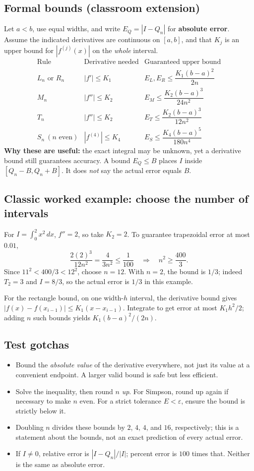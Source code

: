\documentclass[11pt]{article}
\newcommand{\dx}{\,dx}
\begin{document}
\subsection*{Formal bounds (classroom extension)}
Let $a<b$, use equal widths, and write $E_Q=|I-Q_n|$ for \textbf{absolute error}. Assume the indicated derivatives are continuous on $[a,b]$, and that $K_j$ is an upper bound for $|f^{(j)}(x)|$ on the \emph{whole} interval.
\[
\begin{array}{c|c|c}
\text{Rule}&\text{Derivative needed}&\text{Guaranteed upper bound}\\\hline
L_n\text{ or }R_n&|f'|\le K_1&E_L,E_R\le\dfrac{K_1(b-a)^2}{2n}\\[0.8em]
M_n&|f''|\le K_2&E_M\le\dfrac{K_2(b-a)^3}{24n^2}\\[0.8em]
T_n&|f''|\le K_2&E_T\le\dfrac{K_2(b-a)^3}{12n^2}\\[0.8em]
S_n\ (n\text{ even})&|f^{(4)}|\le K_4&E_S\le\dfrac{K_4(b-a)^5}{180n^4}
\end{array}
\]
\textbf{Why these are useful:} the exact integral may be unknown, yet a derivative bound still guarantees accuracy. A bound $E_Q\le B$ places $I$ inside $[Q_n-B,Q_n+B]$. It does \emph{not} say the actual error equals $B$.

\subsection*{Classic worked example: choose the number of intervals}
For $I=\int_0^2x^2\dx$, $f''=2$, so take $K_2=2$. To guarantee trapezoidal error at most $0.01$,
\[
\frac{2(2)^3}{12n^2}=\frac4{3n^2}\le\frac1{100}
\quad\Longrightarrow\quad n^2\ge\frac{400}{3}.
\]
Since $11^2<400/3<12^2$, choose $n=12$. With $n=2$, the bound is $1/3$; indeed $T_2=3$ and $I=8/3$, so the actual error is $1/3$ in this example.

For the rectangle bound, on one width-$h$ interval, the derivative bound gives
$|f(x)-f(x_{i-1})|\le K_1(x-x_{i-1})$. Integrate to get error at most $K_1h^2/2$; adding $n$ such bounds yields $K_1(b-a)^2/(2n)$.

\subsection*{Test gotchas}
\begin{itemize}
\item Bound the \emph{absolute value} of the derivative everywhere, not just its value at a convenient endpoint. A larger valid bound is safe but less efficient.
\item Solve the inequality, then round $n$ \emph{up}. For Simpson, round up again if necessary to make $n$ even. For a strict tolerance $E<\varepsilon$, ensure the bound is strictly below it.
\item Doubling $n$ divides these bounds by $2$, $4$, $4$, and $16$, respectively; this is a statement about the bounds, not an exact prediction of every actual error.
\item If $I\ne0$, relative error is $|I-Q_n|/|I|$; percent error is $100$ times that. Neither is the same as absolute error.
\end{itemize}
\end{document}

